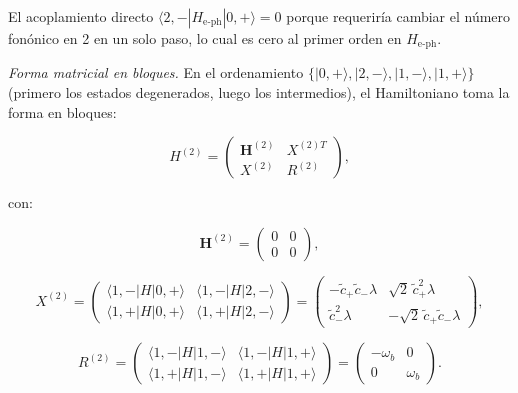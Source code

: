 \documentclass[12pt]{article}
\begin{document}
\noindent
El acoplamiento directo $\langle 2,{-}|H_\mathrm{e\text{-}ph}|0,{+}\rangle = 0$
porque requeriría cambiar el número fonónico en 2 en un solo paso,
lo cual es cero al primer orden en $H_\mathrm{e\text{-}ph}$.

\medskip
\noindent
\textit{Forma matricial en bloques.}
En el ordenamiento
$\{|0,{+}\rangle, |2,{-}\rangle, |1,{-}\rangle, |1,{+}\rangle\}$
(primero los estados degenerados, luego los intermedios), el
Hamiltoniano toma la forma en bloques:

\begin{equation}
	H^{(2)} = \begin{pmatrix}
		\mathbf{H}^{(2)} & X^{(2)T} \\[4pt]
		X^{(2)} & R^{(2)}
	\end{pmatrix},
	\label{eq:H2_bloques}
\end{equation}

con:

\begin{equation}
	\mathbf{H}^{(2)} = \begin{pmatrix} 0 & 0 \\ 0 & 0 \end{pmatrix},
	\label{eq:Hsub2}
\end{equation}

\begin{equation}
	X^{(2)} = \begin{pmatrix}
		\langle 1,{-}|H|0,{+}\rangle & \langle 1,{-}|H|2,{-}\rangle \\[4pt]
		\langle 1,{+}|H|0,{+}\rangle & \langle 1,{+}|H|2,{-}\rangle
	\end{pmatrix}
	= \begin{pmatrix}
		-\tilde{c}_+\tilde{c}_-\lambda & \sqrt{2}\,\tilde{c}_+^2\lambda \\[4pt]
		\tilde{c}_-^2\lambda & -\sqrt{2}\,\tilde{c}_+\tilde{c}_-\lambda
	\end{pmatrix},
	\label{eq:X2}
\end{equation}

\begin{equation}
	R^{(2)} = \begin{pmatrix}
		\langle 1,{-}|H|1,{-}\rangle & \langle 1,{-}|H|1,{+}\rangle \\[4pt]
		\langle 1,{+}|H|1,{-}\rangle & \langle 1,{+}|H|1,{+}\rangle
	\end{pmatrix}
	= \begin{pmatrix}
		-\omega_b & 0 \\[4pt]
		0 & \omega_b
	\end{pmatrix}.
	\label{eq:R2}
\end{equation}
\end{document}
